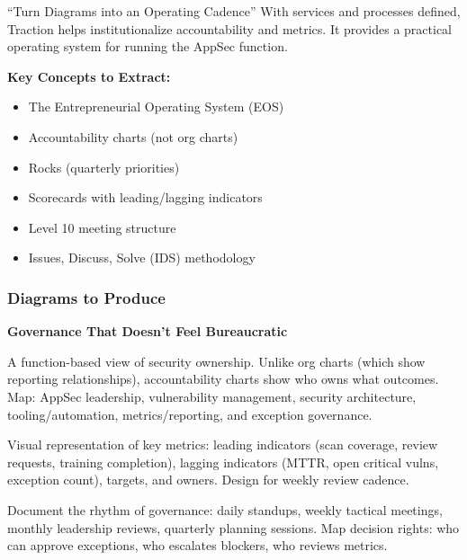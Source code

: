 \documentclass[11pt,letterpaper]{article}
\begin{document}
\begin{bookbox}{``Turn Diagrams into an Operating Cadence''}
With services and processes defined, Traction helps institutionalize accountability and metrics. It provides a practical operating system for running the AppSec function.

\vspace{0.5cm}

\textbf{Key Concepts to Extract:}
\begin{itemize}[nosep]
    \item The Entrepreneurial Operating System (EOS)
    \item Accountability charts (not org charts)
    \item Rocks (quarterly priorities)
    \item Scorecards with leading/lagging indicators
    \item Level 10 meeting structure
    \item Issues, Discuss, Solve (IDS) methodology
\end{itemize}
\end{bookbox}

\subsubsection{Diagrams to Produce}

\begin{diagrambox}
\textbf{Governance That Doesn't Feel Bureaucratic}

\begin{description}[leftmargin=1.5cm, style=nextline]
    \item[Accountability Chart]
    A function-based view of security ownership. Unlike org charts (which show reporting relationships), accountability charts show who owns what outcomes. Map: AppSec leadership, vulnerability management, security architecture, tooling/automation, metrics/reporting, and exception governance.

    \item[Scorecard Diagram]
    Visual representation of key metrics: leading indicators (scan coverage, review requests, training completion), lagging indicators (MTTR, open critical vulns, exception count), targets, and owners. Design for weekly review cadence.

    \item[Meeting/Decision Cadence Map]
    Document the rhythm of governance: daily standups, weekly tactical meetings, monthly leadership reviews, quarterly planning sessions. Map decision rights: who can approve exceptions, who escalates blockers, who reviews metrics.
\end{description}
\end{diagrambox}
\end{document}
